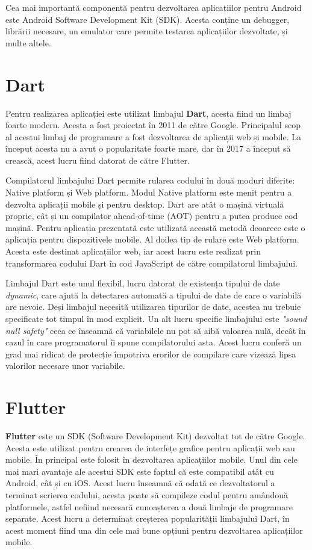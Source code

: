 \documentclass[12pt,a4paper]{report}
\theoremstyle{definition}
\theoremstyle{remark}
\begin{document}
Cea mai importantă componentă pentru dezvoltarea aplicațiilor pentru Android este Android Software Development Kit (SDK). Acesta conține un debugger, librării necesare, un emulator care permite testarea aplicațiilor dezvoltate, și multe altele. \cite{androidwikipedia:2023} \cite{androidsdkwikipedia:2023}
\newpage
\section{Dart}
Pentru realizarea aplicației este utilizat limbajul \textbf{Dart}, acesta fiind un limbaj foarte modern. Acesta a fost proiectat în 2011 de către Google. Principalul scop al acestui limbaj de programare a fost dezvoltarea de aplicații web și mobile. La început acesta nu a avut o popularitate foarte mare, dar în 2017 a început să crească, acest lucru fiind datorat de către Flutter. 

Compilatorul limbajului Dart permite rularea codului în două moduri diferite: Native platform și Web platform. Modul Native platform este menit pentru a dezvolta aplicații mobile și pentru desktop. Dart are atât o mașină virtuală proprie, cât și un compilator ahead-of-time (AOT) pentru a putea produce cod mașină. Pentru aplicația prezentată este utilizată această metodă deoarece este o aplicația pentru dispozitivele mobile. Al doilea tip de rulare este Web platform. Acesta este destinat aplicațiilor web, iar acest lucru este realizat prin transformarea codului Dart în cod JavaScript de către compilatorul limbajului.

Limbajul Dart este unul flexibil, lucru datorat de existența tipului de date \emph{dynamic}, care ajută la detectarea automată a tipului de date de care o variabilă are nevoie. Deși limbajul necesită utilizarea tipurilor de date, acestea nu trebuie specificate tot timpul în mod explicit. Un alt lucru specific limbajului este \emph{"sound null safety"} ceea ce înseamnă că variabilele nu pot să aibă valoarea nulă, decât în cazul în care programatorul îi spune compilatorului asta. Acest lucru conferă un grad mai ridicat de protecție împotriva erorilor de compilare care vizează lipsa valorilor necesare unor variabile. \cite{dart:2023} 
\section{Flutter}
\textbf{Flutter} este un SDK (Software Development Kit) dezvoltat tot de către Google. Acesta este utilizat pentru crearea de interfețe grafice pentru aplicații web sau mobile. În principal este folosit în dezvoltarea aplicațiilor mobile. Unul din cele mai mari avantaje ale acestui SDK este faptul că este compatibil atât cu Android, cât și cu iOS. Acest lucru înseamnă că odată ce dezvoltatorul a terminat scrierea codului, acesta poate să compileze codul pentru amândouă platformele, astfel nefiind necesară cunoașterea a două limbaje de programare separate. Acest lucru a determinat creșterea popularității limbajului Dart, în acest moment fiind una din cele mai bune opțiuni pentru dezvoltarea aplicațiilor mobile.
\end{document}
